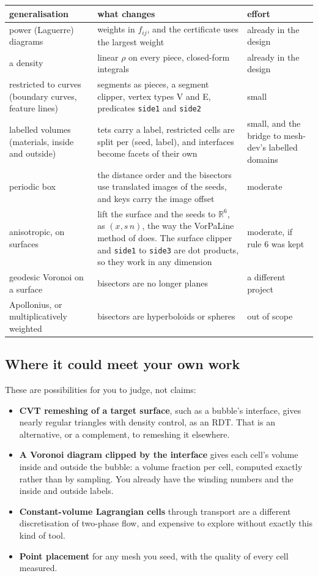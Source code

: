 \documentclass[11pt,a4paper]{article}
\newcommand{\code}[1]{\texttt{#1}}          %
\newcommand{\R}{\mathbb{R}}
\begin{document}
{\small
\begin{xltabular}{\linewidth}{@{}P{3.2cm} L P{3.3cm}@{}}
\toprule
generalisation & what changes & effort \\
\midrule
\endhead
power (Laguerre) diagrams & weights in $f_{ij}$, and the certificate uses the largest weight
  & already in the design \\
a density & linear $\rho$ on every piece, closed-form integrals & already in the design \\
restricted to curves (boundary curves, feature lines)
  & segments as pieces, a segment clipper, vertex types V and E, predicates \code{side1} and
    \code{side2} & small \\
labelled volumes (materials, inside and outside)
  & tets carry a label, restricted cells are split per (seed, label), and interfaces become
    facets of their own & small, and the bridge to mesh-dev's labelled domains \\
periodic box
  & the distance order and the bisectors use translated images of the seeds, and keys carry the
    image offset & moderate \\
anisotropic, on surfaces
  & lift the surface and the seeds to $\R^6$, as $(x, s\,n)$, the way the VorPaLine method of
    \citet{levy2012} does. The surface clipper and \code{side1} to \code{side3} are dot
    products, so they work in any dimension & moderate, if rule 6 was kept \\
geodesic Voronoi on a surface & bisectors are no longer planes & a different project \\
Apollonius, or multiplicatively weighted & bisectors are hyperboloids or spheres
  & out of scope \\
\bottomrule
\end{xltabular}}

\subsection{Where it could meet your own work}\label{ssec:yourwork}

These are possibilities for you to judge, not claims:

\begin{itemize}
\item \textbf{CVT remeshing of a target surface}, such as a bubble's interface, gives nearly
  regular triangles with density control, as an RDT. That is an alternative, or a complement, to
  remeshing it elsewhere.
\item \textbf{A Voronoi diagram clipped by the interface} gives each cell's volume inside and
  outside the bubble: a volume fraction per cell, computed exactly rather than by sampling. You
  already have the winding numbers and the inside and outside labels.
\item \textbf{Constant-volume Lagrangian cells} through transport \citep{degoes2015,levy2022} are
  a different discretisation of two-phase flow, and expensive to explore without exactly this
  kind of tool.
\item \textbf{Point placement} for any mesh you seed, with the quality of every cell measured.
\end{itemize}
\end{document}
